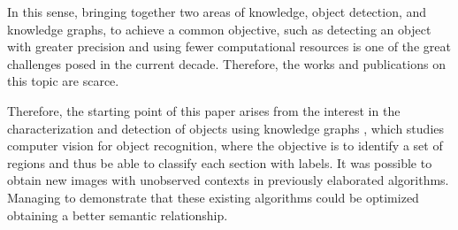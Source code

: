 In this sense, bringing together two areas of knowledge, object detection, and 
knowledge graphs, to achieve a common objective, such as detecting an object 
with greater precision and using fewer computational resources is one of the 
great challenges posed in the current decade. Therefore, the works and 
publications on this topic are scarce.

Therefore, the starting point of this paper arises from the interest in the 
characterization and detection of objects using knowledge graphs \cite{Fang}, 
which studies computer vision for object recognition, where the objective is 
to identify a set of regions and thus be able to classify each section with 
labels. It was possible to obtain new images with unobserved contexts in 
previously elaborated algorithms. Managing to demonstrate that these existing 
algorithms could be optimized obtaining a better semantic relationship.
